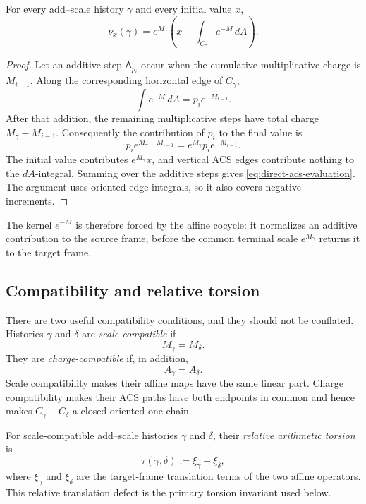 \begin{proposition}
\label{prop:acs-evaluation}
For every add--scale history \(\gamma\) and every initial value \(x\),
\begin{equation}
    \nu_x(\gamma)
      =e^{M_\gamma}
        \left(x+\int_{C_\gamma}e^{-M}\,dA\right).
    \label{eq:direct-acs-evaluation}
\end{equation}
\end{proposition}

\begin{proof}
Let an additive step \(\mathsf A_{p_i}\) occur when the cumulative
multiplicative charge is \(M_{i-1}\).  Along the corresponding horizontal edge
of \(C_\gamma\),
\[
    \int e^{-M}\,dA=p_i e^{-M_{i-1}}.
\]
After that addition, the remaining multiplicative steps have total charge
\(M_\gamma-M_{i-1}\).  Consequently the contribution of \(p_i\) to the final
value is
\[
    p_i e^{M_\gamma-M_{i-1}}
      =e^{M_\gamma}p_i e^{-M_{i-1}}.
\]
The initial value contributes \(e^{M_\gamma}x\), and vertical ACS edges
contribute nothing to the \(dA\)-integral.  Summing over the additive steps
gives \eqref{eq:direct-acs-evaluation}.  The argument uses oriented edge
integrals, so it also covers negative increments.
\end{proof}

The kernel \(e^{-M}\) is therefore forced by the affine cocycle: it normalizes
an additive contribution to the source frame, before the common terminal scale
\(e^{M_\gamma}\) returns it to the target frame.

\subsection{Compatibility and relative torsion}

There are two useful compatibility conditions, and they should not be
conflated.  Histories \(\gamma\) and \(\delta\) are \emph{scale-compatible} if
\[
    M_\gamma=M_\delta.
\]
They are \emph{charge-compatible} if, in addition,
\[
    A_\gamma=A_\delta.
\]
Scale compatibility makes their affine maps have the same linear part.  Charge
compatibility makes their ACS paths have both endpoints in common and hence
makes \(C_\gamma-C_\delta\) a closed oriented one-chain.

\begin{definition}
\label{def:relative-torsion}
For scale-compatible add--scale histories \(\gamma\) and \(\delta\), their \emph{relative
arithmetic torsion} is
\begin{equation}
    \tau(\gamma,\delta)
       :=\xi_\gamma-\xi_\delta,
    \label{eq:relative-torsion}
\end{equation}
where \(\xi_\gamma\) and \(\xi_\delta\) are the target-frame translation
terms of the two affine operators.  This relative translation defect is the
primary torsion invariant used below.
\end{definition}


